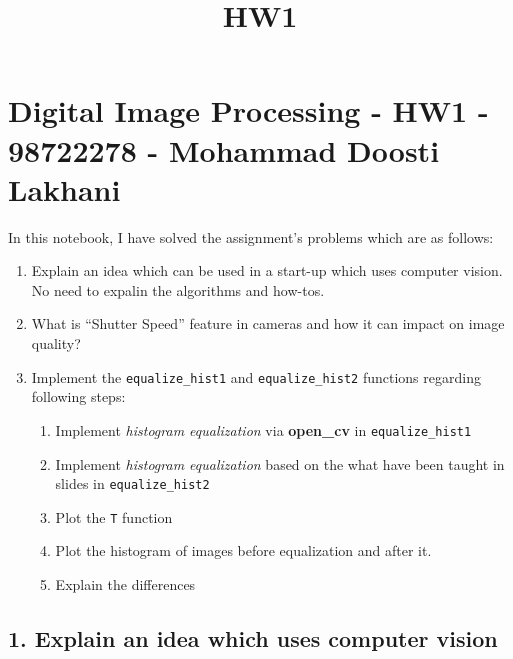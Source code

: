\documentclass[11pt]{article}
\title{HW1}
\providecommand{\tightlist}{%
      \setlength{\itemsep}{0pt}\setlength{\parskip}{0pt}}
\begin{document}
    
    
    \maketitle
    
    

    
    \hypertarget{digital-image-processing---hw1---98722278---mohammad-doosti-lakhani}{%
\section{Digital Image Processing - HW1 - 98722278 - Mohammad Doosti
Lakhani}\label{digital-image-processing---hw1---98722278---mohammad-doosti-lakhani}}

In this notebook, I have solved the assignment's problems which are as
follows:

\begin{enumerate}
\def\labelenumi{\arabic{enumi}.}
\tightlist
\item
  Explain an idea which can be used in a start-up which uses computer
  vision. No need to expalin the algorithms and how-tos.
\item
  What is ``Shutter Speed'' feature in cameras and how it can impact on
  image quality?
\item
  Implement the \texttt{equalize\_hist1} and \texttt{equalize\_hist2}
  functions regarding following steps:

  \begin{enumerate}
  \def\labelenumii{\arabic{enumii}.}
  \tightlist
  \item
    Implement \emph{histogram equalization} via \textbf{open\_cv} in
    \texttt{equalize\_hist1}
  \item
    Implement \emph{histogram equalization} based on the what have been
    taught in slides in \texttt{equalize\_hist2}
  \item
    Plot the \texttt{T} function
  \item
    Plot the histogram of images before equalization and after it.
  \item
    Explain the differences
  \end{enumerate}
\end{enumerate}

    \hypertarget{explain-an-idea-which-uses-computer-vision}{%
\subsection{1. Explain an idea which uses computer
vision}\label{explain-an-idea-which-uses-computer-vision}}
\end{document}
